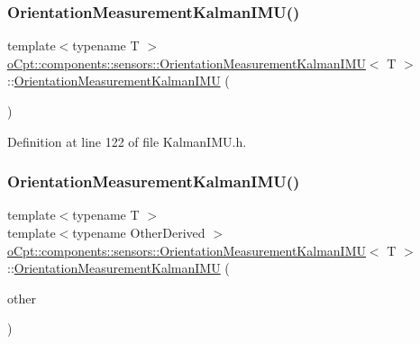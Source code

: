 \subsubsection{\texorpdfstring{Orientation\+Measurement\+Kalman\+I\+M\+U()}{OrientationMeasurementKalmanIMU()}\hspace{0.1cm}{\footnotesize\ttfamily [1/2]}}
{\footnotesize\ttfamily template$<$typename T $>$ \\
\hyperlink{classo_cpt_1_1components_1_1sensors_1_1_orientation_measurement_kalman_i_m_u}{o\+Cpt\+::components\+::sensors\+::\+Orientation\+Measurement\+Kalman\+I\+MU}$<$ T $>$\+::\hyperlink{classo_cpt_1_1components_1_1sensors_1_1_orientation_measurement_kalman_i_m_u}{Orientation\+Measurement\+Kalman\+I\+MU} (\begin{DoxyParamCaption}\item[{void}]{ }\end{DoxyParamCaption})\hspace{0.3cm}{\ttfamily [inline]}}



Definition at line 122 of file Kalman\+I\+M\+U.\+h.

\hypertarget{classo_cpt_1_1components_1_1sensors_1_1_orientation_measurement_kalman_i_m_u_a3d730c7be246a1ea2ef3c4074f0f6ca9}{}\label{classo_cpt_1_1components_1_1sensors_1_1_orientation_measurement_kalman_i_m_u_a3d730c7be246a1ea2ef3c4074f0f6ca9} 
\subsubsection{\texorpdfstring{Orientation\+Measurement\+Kalman\+I\+M\+U()}{OrientationMeasurementKalmanIMU()}\hspace{0.1cm}{\footnotesize\ttfamily [2/2]}}
{\footnotesize\ttfamily template$<$typename T $>$ \\
template$<$typename Other\+Derived $>$ \\
\hyperlink{classo_cpt_1_1components_1_1sensors_1_1_orientation_measurement_kalman_i_m_u}{o\+Cpt\+::components\+::sensors\+::\+Orientation\+Measurement\+Kalman\+I\+MU}$<$ T $>$\+::\hyperlink{classo_cpt_1_1components_1_1sensors_1_1_orientation_measurement_kalman_i_m_u}{Orientation\+Measurement\+Kalman\+I\+MU} (\begin{DoxyParamCaption}\item[{const Eigen\+::\+Matrix\+Base$<$ Other\+Derived $>$ \&}]{other }\end{DoxyParamCaption})\hspace{0.3cm}{\ttfamily [inline]}}



